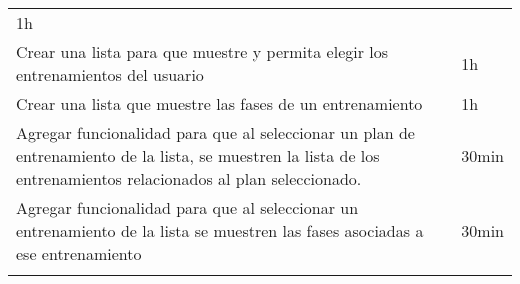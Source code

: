 \begin{enumerate}
\begin{longtable}[c]{@{}ll@{}}
\begin{minipage}[t]{0.08\columnwidth}
  1h
  \end{minipage}
  \\\noalign{\medskip}
  \begin{minipage}[t]{0.92\columnwidth}\raggedright
  Crear una lista para que muestre y permita elegir los entrenamientos
  del usuario
  \end{minipage} & \begin{minipage}[t]{0.08\columnwidth}\raggedright
  1h
  \end{minipage}
  \\\noalign{\medskip}
  \begin{minipage}[t]{0.92\columnwidth}\raggedright
  Crear una lista que muestre las fases de un entrenamiento
  \end{minipage} & \begin{minipage}[t]{0.08\columnwidth}\raggedright
  1h
  \end{minipage}
  \\\noalign{\medskip}
  \begin{minipage}[t]{0.92\columnwidth}\raggedright
  Agregar funcionalidad para que al seleccionar un plan de entrenamiento
  de la lista, se muestren la lista de los entrenamientos relacionados
  al plan seleccionado.
  \end{minipage} & \begin{minipage}[t]{0.08\columnwidth}\raggedright
  30min
  \end{minipage}
  \\\noalign{\medskip}
  \begin{minipage}[t]{0.92\columnwidth}\raggedright
  Agregar funcionalidad para que al seleccionar un entrenamiento de la
  lista se muestren las fases asociadas a ese entrenamiento
  \end{minipage} & \begin{minipage}[t]{0.08\columnwidth}\raggedright
  30min
  \end{minipage}
  \\\noalign{\medskip}
  \hline
  \end{longtable}
\end{enumerate}
